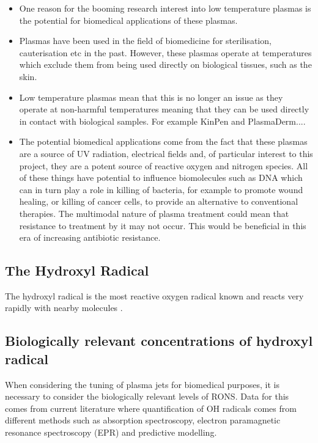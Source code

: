 \documentclass[11pt, oneside]{article}   	%
\begin{document}
\begin{itemize}

\item One reason for the booming research interest into low temperature plasmas is the potential for biomedical applications of these plasmas.
\item Plasmas have been used in the field of biomedicine for sterilisation, cauterisation etc in the past. However, these plasmas operate at temperatures which exclude them from being used directly on biological tissues, such as the skin.
\item Low temperature plasmas mean that this is no longer an issue as they operate at non-harmful temperatures meaning that they can be used directly in contact with biological samples. 
For example KinPen and PlasmaDerm....

\item The potential biomedical applications come from the fact that these plasmas are a source of UV radiation, electrical fields and, of particular interest to this project, they are a potent source of reactive oxygen and nitrogen species. All of these things have potential to influence biomolecules such as DNA which can in turn play a role in killing of bacteria, for example to promote wound healing, or killing of cancer cells, to provide an alternative to conventional therapies. 
The multimodal nature of plasma treatment could mean that resistance to treatment by it may not occur. 
This would be beneficial in this era of increasing antibiotic resistance.

\end{itemize}

\subsection{The Hydroxyl Radical}

The hydroxyl radical is the most reactive oxygen radical known and reacts very rapidly with nearby molecules \cite{Halliwell2007}.

\subsection{Biologically relevant concentrations of hydroxyl radical}

When considering the tuning of plasma jets for biomedical purposes, it is necessary to consider the biologically relevant levels of RONS.
Data for this comes from current literature where quantification of OH radicals comes from different methods such as absorption spectroscopy, electron paramagnetic resonance spectroscopy (EPR) and predictive modelling.
\end{document}
